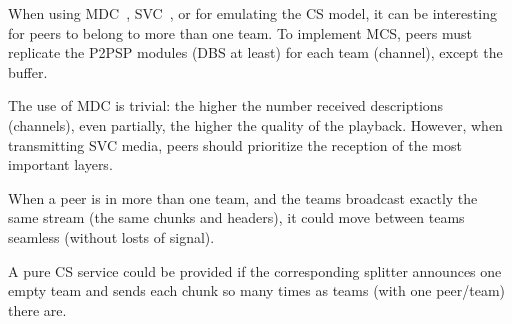 
\label{sec:MCS}

When using MDC~\cite{baccichet2007content}, SVC~\cite{chu2009auction},
or for emulating the CS model, it can be interesting for peers to
belong to more than one team. To implement MCS, peers must replicate
the P2PSP modules (DBS at least) for each team (channel), except the
buffer.

The use of MDC is trivial: the higher the number received descriptions
(channels), even partially, the higher the quality of the
playback. However, when transmitting SVC media, peers should
prioritize the reception of the most important layers.

When a peer is in more than one team, and the teams broadcast exactly
the same stream (the same chunks and headers), it could move between
teams seamless (without losts of signal).

A pure CS service could be provided if the corresponding splitter
announces one empty team and sends each chunk so many times as teams
(with one peer/team) there are.
